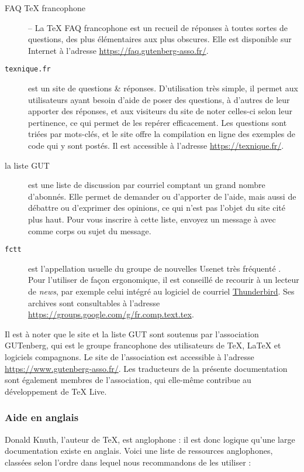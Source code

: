 \documentclass[german, english, french, 12pt]{article}
\renewcommand{\TL}{\TeX{} Live\xspace}%
\begin{document}
\begin{description}
\item [FAQ \TeX{} francophone] -- La \TeX{} FAQ francophone est un recueil de
  réponses à toutes sortes de questions, des plus élémentaires aux plus
  obscures. Elle est disponible sur Internet à l'adresse
  \url{https://faq.gutenberg-asso.fr/}.

\item[\texttt{texnique.fr}] est un site de questions \& réponses.  D'utilisation
  très simple, il permet aux utilisateurs ayant besoin d'aide de poser des
  questions, à d'autres de leur apporter des réponses, et aux visiteurs du site
  de noter celles-ci selon leur pertinence, ce qui permet de les repérer
  efficacement.  Les questions sont triées par mots-clés, et le site offre la
  compilation en ligne des exemples de code qui y sont postés.  Il est
  accessible à l'adresse \url{https://texnique.fr/}.

\item[la liste GUT] est une liste de discussion par courriel comptant un grand
  nombre d'abonnés.  Elle permet de demander ou d'apporter de l'aide, mais aussi
  de débattre ou d'exprimer des opinions, ce qui n'est pas l'objet du site cité
  plus haut.  Pour vous inscrire à cette liste, envoyez un message
  à  avec  comme corps ou sujet du
  message.

\item[\texttt{fctt}] est l'appellation usuelle du groupe de nouvelles Usenet
  très fréquenté . Pour l'utiliser de façon ergonomique,
  il est conseillé de recourir à un lecteur de \emph{news}, par exemple celui
  intégré au logiciel de courriel
  \href{https://www.mozilla.org/fr/thunderbird/}{Thunderbird}.  Ses archives
sont consultables à l'adresse
\url{https://groups.google.com/g/fr.comp.text.tex}.
\end{description}
Il est à noter que le site  et la liste GUT sont soutenus
par l'association GUTenberg, qui est le groupe francophone des utilisateurs de
\TeX{}, \LaTeX{} et logiciels compagnons. Le site de l'association est
accessible à l'adresse \url{https://www.gutenberg-asso.fr/}.  Les traducteurs de
la présente documentation sont également membres de l'association, qui elle-même
contribue au développement de \TL{}.

\subsubsection{Aide en anglais}
Donald Knuth, l'auteur de \TeX, est anglophone : il est donc logique qu'une
large documentation existe en anglais. Voici une liste de ressources
anglophones, classées selon l'ordre dans lequel nous recommandons de les
utiliser :
\end{document}
